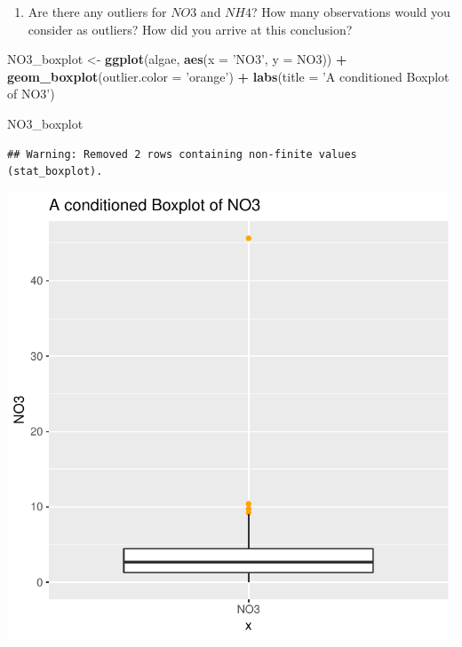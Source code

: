\documentclass[]{article}
\newenvironment{Shaded}{\begin{snugshade}}{\end{snugshade}}
\newcommand{\KeywordTok}[1]{\textcolor[rgb]{0.13,0.29,0.53}{\textbf{#1}}}
\newcommand{\DataTypeTok}[1]{\textcolor[rgb]{0.13,0.29,0.53}{#1}}
\newcommand{\StringTok}[1]{\textcolor[rgb]{0.31,0.60,0.02}{#1}}
\newcommand{\OperatorTok}[1]{\textcolor[rgb]{0.81,0.36,0.00}{\textbf{#1}}}
\newcommand{\NormalTok}[1]{#1}
\providecommand{\tightlist}{%
  \setlength{\itemsep}{0pt}\setlength{\parskip}{0pt}}
\begin{document}
\begin{enumerate}
\tightlist
\item
  Are there any outliers for \(NO3\) and \(NH4\)? How many observations
  would you consider as outliers? How did you arrive at this conclusion?
\end{enumerate}

\begin{Shaded}
\begin{Highlighting}[]
\NormalTok{NO3_boxplot <-}\StringTok{ }\KeywordTok{ggplot}\NormalTok{(algae, }\KeywordTok{aes}\NormalTok{(}\DataTypeTok{x =} \StringTok{'NO3'}\NormalTok{, }\DataTypeTok{y =}\NormalTok{ NO3)) }\OperatorTok{+}\StringTok{ }
\StringTok{  }\KeywordTok{geom_boxplot}\NormalTok{(}\DataTypeTok{outlier.color =} \StringTok{'orange'}\NormalTok{) }\OperatorTok{+}
\StringTok{  }\KeywordTok{labs}\NormalTok{(}\DataTypeTok{title =} \StringTok{'A conditioned Boxplot of NO3'}\NormalTok{)}

\NormalTok{NO3_boxplot }
\end{Highlighting}
\end{Shaded}

\begin{verbatim}
## Warning: Removed 2 rows containing non-finite values (stat_boxplot).
\end{verbatim}

\begin{center}\includegraphics{homework1-handout_files/figure-latex/unnamed-chunk-2-1} \end{center}
\end{document}

